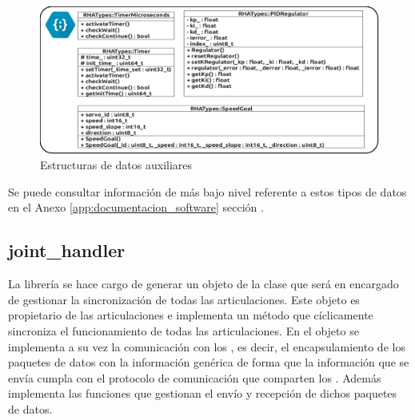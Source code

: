         \begin{figure}[H]
            \centering
            \includegraphics[width=1\textwidth]{figuras/Imagenes_SW/class_diagram_TRHA.jpg}
            \caption{Estructuras de datos auxiliares}
            \label{fig:SW:class_diagram_TRHA}
        \end{figure}

        Se puede consultar información de más bajo nivel referente a estos tipos de datos en el Anexo \ref{app:documentacion_software} sección \completar.
    \subsection{joint\_handler} \label{subsec:SW:lib:joint_handler}
        La librería  se hace cargo de generar un objeto de la clase  que será en encargado de gestionar la sincronización de todas las articulaciones. Este objeto es propietario de las articulaciones e implementa un método que cíclicamente sincroniza el funcionamiento de todas las articulaciones. En el objeto  se implementa a su vez la comunicación con los , es decir, el encapsulamiento de los paquetes de datos con la información genérica de forma que la información que se envía cumpla con el protocolo de comunicación que comparten los . Además implementa las funciones que gestionan el envío y recepción de dichos paquetes de datos.

